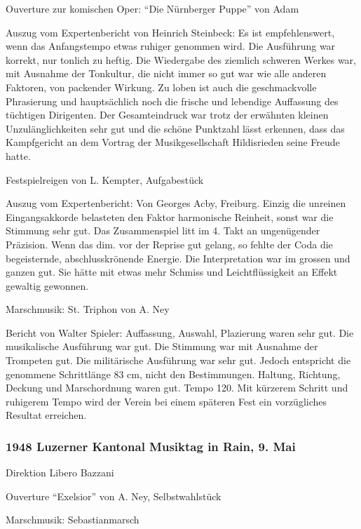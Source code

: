 \begin{history}
    Ouverture zur komischen Oper: \enquote{Die Nürnberger Puppe} von Adam

    Auszug vom Expertenbericht von Heinrich Steinbeck: Es ist empfehlenswert,
    wenn das Anfangstempo etwas ruhiger genommen wird. Die Ausführung war
    korrekt, nur tonlich zu heftig. Die Wiedergabe des ziemlich schweren Werkes
    war, mit Ausnahme der Tonkultur, die nicht immer so gut war wie alle anderen
    Faktoren, von packender Wirkung. Zu loben ist auch die geschmackvolle
    Phrasierung und hauptsächlich noch die frische und lebendige Auffassung des
    tüchtigen Dirigenten. Der Gesamteindruck war trotz der erwähnten kleinen
    Unzulänglichkeiten sehr gut und die schöne Punktzahl lässt erkennen, dass
    das Kampfgericht an dem Vortrag der Musikgesellschaft Hildisrieden seine
    Freude hatte.

    Festspielreigen von L. Kempter, Aufgabestück

    Auszug vom Expertenbericht: Von Georges Acby, Freiburg. Einzig die unreinen
    Eingangsakkorde belasteten den Faktor harmonische Reinheit, sonst war die
    Stimmung sehr gut. Das Zusammenspiel litt im 4. Takt an ungenügender
    Präzision. Wenn das dim. vor der Reprise gut gelang, so fehlte der Coda die
    begeisternde, abschlusskrönende Energie. Die Interpretation war im grossen
    und ganzen gut. Sie hätte mit etwas mehr Schmiss und Leichtflüssigkeit an
    Effekt gewaltig gewonnen.

    Marschmusik: St. Triphon von A. Ney

    Bericht von Walter Spieler: Auffassung, Auswahl, Plazierung waren sehr gut.
    Die musikalische Ausführung war gut. Die Stimmung war mit Ausnahme der
    Trompeten gut. Die militärische Ausführung war sehr gut. Jedoch entspricht
    die genommene Schrittlänge 83 cm, nicht den Bestimmungen. Haltung, Richtung,
    Deckung und Marschordnung waren gut. Tempo 120. Mit kürzerem Schritt und
    ruhigerem Tempo wird der Verein bei einem späteren Fest ein vorzügliches
    Resultat erreichen.

    \subsubsection{1948 Luzerner Kantonal Musiktag in Rain, 9. Mai}

    Direktion Libero Bazzani

    Ouverture \enquote{Exelsior} von A. Ney, Selbstwahlstück

    Marschmusik: Sebastianmarsch


\end{history}
